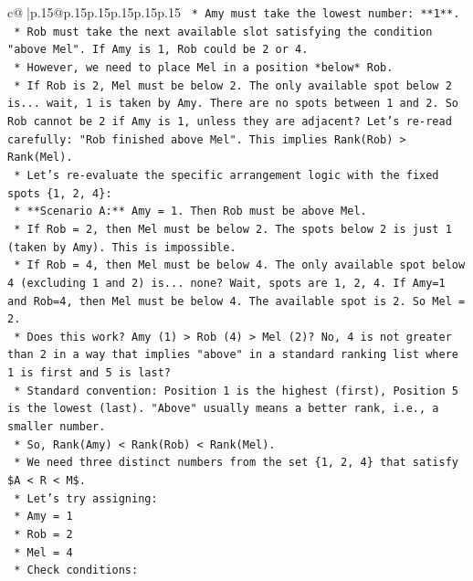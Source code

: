 \documentclass{article}
\begin{document}
{\begin{supertabular}{c@{$\;$}|p{.15\linewidth}@{}p{.15\linewidth}p{.15\linewidth}p{.15\linewidth}p{.15\linewidth}p{.15\linewidth}}
{{{\texttt{        *   Amy must take the lowest number: **1**.} \\
\texttt{        *   Rob must take the next available slot satisfying the condition "above Mel". If Amy is 1, Rob could be 2 or 4.} \\
\texttt{        *   However, we need to place Mel in a position *below* Rob.} \\
\texttt{        *   If Rob is 2, Mel must be below 2. The only available spot below 2 is... wait, 1 is taken by Amy. There are no spots between 1 and 2. So Rob cannot be 2 if Amy is 1, unless they are adjacent? Let's re{-}read carefully: "Rob finished above Mel". This implies Rank(Rob) > Rank(Mel).} \\
\texttt{        *   Let's re{-}evaluate the specific arrangement logic with the fixed spots \{1, 2, 4\}:} \\
\texttt{            *   **Scenario A:** Amy = 1. Then Rob must be above Mel.} \\
\texttt{                *   If Rob = 2, then Mel must be below 2. The spots below 2 is just 1 (taken by Amy). This is impossible.} \\
\texttt{                *   If Rob = 4, then Mel must be below 4. The only available spot below 4 (excluding 1 and 2) is... none? Wait, spots are 1, 2, 4. If Amy=1 and Rob=4, then Mel must be below 4. The available spot is 2. So Mel = 2.} \\
\texttt{                *   Does this work? Amy (1) > Rob (4) > Mel (2)? No, 4 is not greater than 2 in a way that implies "above" in a standard ranking list where 1 is first and 5 is last?} \\
\texttt{                *   Standard convention: Position 1 is the highest (first), Position 5 is the lowest (last). "Above" usually means a better rank, i.e., a smaller number.} \\
\texttt{                *   So, Rank(Amy) < Rank(Rob) < Rank(Mel).} \\
\texttt{                *   We need three distinct numbers from the set \{1, 2, 4\} that satisfy \$A < R < M\$.} \\
\texttt{                *   Let's try assigning:} \\
\texttt{                    *   Amy = 1} \\
\texttt{                    *   Rob = 2} \\
\texttt{                    *   Mel = 4} \\
\texttt{                *   Check conditions:} \\
}}}
\end{supertabular}}
\end{document}
